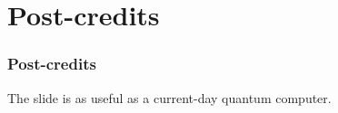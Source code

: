\documentclass[]{beamer}
\begin{document}
\section{Post-credits}

\begin{frame}[noframenumbering]
\frametitle{Post-credits}
The slide is as useful as a current-day quantum computer.
\end{frame}

\end{document}
